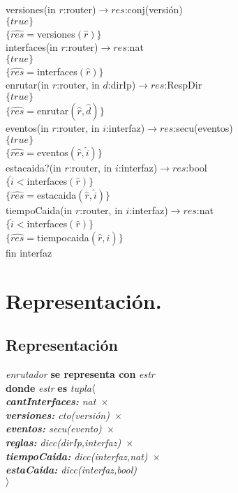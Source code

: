 \documentclass[11pt, a4paper]{article}
\begin{document}
versiones(in $r$:router)$\longrightarrow res$:conj(versi\'on)\\
$\{true\}$\\
$\{\widehat{res}=$versiones$(\widehat{r})\}$\\

interfaces(in $r$:router)$\longrightarrow res$:nat\\
$\{true\}$\\
$\{\widehat{res}=$interfaces$(\widehat{r})\}$\\

enrutar(in $r$:router, in $d$:dirIp)$\longrightarrow res$:RespDir\\
$\{true\}$\\
$\{\widehat{res}=$enrutar$(\widehat{r},\widehat{d})\}$\\

eventos(in $r$:router, in $i$:interfaz)$\longrightarrow res$:secu(eventos)\\
$\{true\}$\\
$\{\widehat{res}=$eventos$(\widehat{r},\widehat{i})\}$\\

estacaida?(in $r$:router, in $i$:interfaz)$\longrightarrow res$:bool\\
$\{\widehat{i} < $interfaces$(\widehat{r})\}$\\
$\{\widehat{res}=$estacaida$(\widehat{r},\widehat{i})\}$\\

tiempoCaida(in $r$:router, in $i$:interfaz)$\longrightarrow res$:nat\\
$\{\widehat{i} < $interfaces$(\widehat{r})\}$\\
$\{\widehat{res}=$tiempocaida$(\widehat{r},\widehat{i})\}$\\

fin interfaz\\

\section{Representaci\'on.}






\subsection*{Representaci\'on}
\hspace{-0.75cm}
\textit{enrutador} \textbf{se representa con} \textit{estr}\\
\textbf{donde} \textit{estr} \textbf{es} \textit{tupla$ \\ \langle$\ \\ \textbf{cantInterfaces:} nat\ 	$\times$\   \\ \textbf{versiones:} cto(versi\'on)\ 	$\times$\  \\ \textbf{eventos:} secu(evento)\ $\times$\ \\ \textbf{reglas:} dicc(dirIp,interfaz)\ $\times$\ \\ \textbf{tiempoCaida:} dicc(interfaz,nat)\ $\times$\ \\ \textbf{estaCaida:} dicc(interfaz,bool) \\ $\rangle$}
\end{document}
